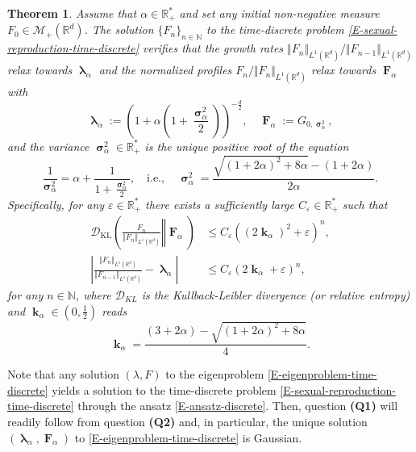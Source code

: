 \documentclass[reqno]{amsart}
\newtheorem{theorem}[definition]{Theorem}
\DeclareMathOperator{\blambda}{\boldsymbol{\lambda}}
\DeclareMathOperator{\bsigma}{\boldsymbol{\sigma}}
\DeclareMathOperator{\bF}{\boldsymbol{F}}
\DeclareMathOperator{\bk}{\boldsymbol{k}}
\numberwithin{equation}{section}
\begin{document}
{\begin{theorem}\label{T-main}
Assume that $\alpha\in \mathbb{R}_+^*$ and set any initial non-negative measure $F_0\in \mathcal{M}_+(\mathbb{R}^d)$. The solution $\{F_n\}_{n\in \mathbb{N}}$ to the time-discrete problem \eqref{E-sexual-reproduction-time-discrete} verifies that the growth rates $\Vert F_n\Vert_{L^1(\mathbb{R}^d)}/\Vert F_{n-1}\Vert_{L^1(\mathbb{R}^d)}$ relax towards $\blambda_\alpha$ and the normalized profiles $F_n/\Vert F_n\Vert_{L^1(\mathbb{R}^d)}$ relax towards $\bF_\alpha$ with
\begin{equation}\label{E-sexual-reproduction-Gaussian-solution}
\blambda_\alpha:=\left(1+\alpha\left(1+\frac{\bsigma_\alpha^2}{2}\right)\right)^{-\frac{d}{2}},\quad \bF_\alpha:=G_{0,\bsigma_\alpha^2},
\end{equation}
and the variance $\bsigma_\alpha^2\in \mathbb{R}_+^*$ is the unique positive root of the equation
\begin{equation}\label{E-sexual-reproduction-Gaussian-solution-variance-equation}
\frac{1}{\bsigma_\alpha^2}=\alpha+\frac{1}{1+\frac{\bsigma_\alpha^2}{2}},\quad \mbox{i.e.},\quad \bsigma_\alpha^2=\frac{\sqrt{(1+2\alpha)^2+8\alpha}-(1+2\alpha)}{2\alpha}.
\end{equation}
Specifically, for any $\varepsilon\in \mathbb{R}_+^*$ there exists a sufficiently large $C_\varepsilon\in \mathbb{R}_+^*$ such that
\begin{align*}
\mathcal{D}_{\text{KL}}\left(\left.\frac{F_n}{\Vert F_n\Vert_{L^1(\mathbb{R}^d)}}\right\Vert  \bF_\alpha\right)&\leq C_\varepsilon((2\bk_\alpha)^2+\varepsilon)^n,\\
\left\vert\frac{\Vert F_n\Vert_{L^1(\mathbb{R}^d)}}{\Vert F_{n-1}\Vert_{L^1(\mathbb{R}^d)}}-\blambda_\alpha\right\vert&\leq C_\varepsilon(2\bk_\alpha+\varepsilon)^n,
\end{align*}
for any $n\in \mathbb{N}$, where $\mathcal{D}_{KL}$ is the Kullback-Leibler divergence (or relative entropy) and $\bk_\alpha\in (0,\frac{1}{2})$ reads
\begin{equation}\label{E-sexual-reproduction-coefficients-limit}
\bk_\alpha=\frac{(3+2\alpha)-\sqrt{(1+2\alpha)^2+8\alpha}}{4}.
\end{equation}
\end{theorem}

Note that any solution $(\lambda,F)$ to the eigenproblem \eqref{E-eigenproblem-time-discrete} yields a solution to the time-discrete problem \eqref{E-sexual-reproduction-time-discrete} through the ansatz \eqref{E-ansatz-discrete}. Then, question {\bf (Q1)} will readily follow from question {\bf (Q2)} and, in particular, the unique solution $(\blambda_\alpha,\bF_\alpha)$ to \eqref{E-eigenproblem-time-discrete} is Gaussian. 


}
\end{document}
